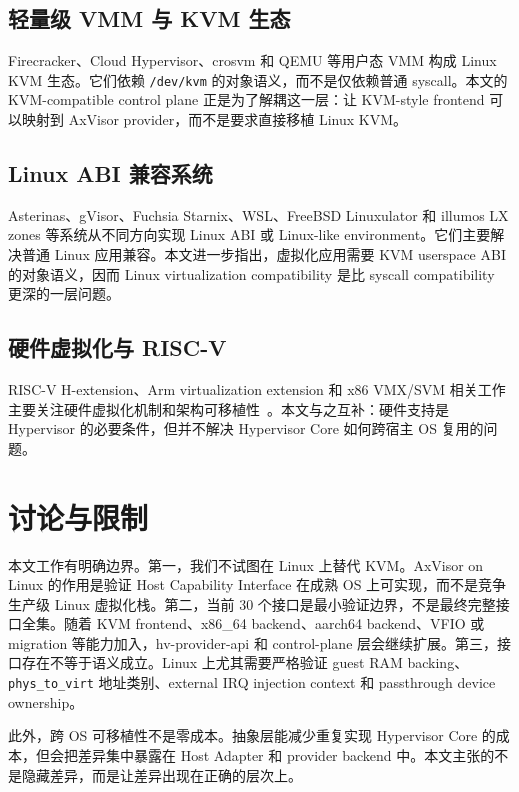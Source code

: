 \documentclass[a4paper,11pt]{article}
\begin{document}
\subsection{轻量级 VMM 与 KVM 生态}

Firecracker、Cloud Hypervisor、crosvm 和 QEMU 等用户态 VMM 构成 Linux KVM 生态。它们依赖 \texttt{/dev/kvm} 的对象语义，而不是仅依赖普通 syscall。本文的 KVM-compatible control plane 正是为了解耦这一层：让 KVM-style frontend 可以映射到 AxVisor provider，而不是要求直接移植 Linux KVM。

\subsection{Linux ABI 兼容系统}

Asterinas、gVisor、Fuchsia Starnix、WSL、FreeBSD Linuxulator 和 illumos LX zones 等系统从不同方向实现 Linux ABI 或 Linux-like environment。它们主要解决普通 Linux 应用兼容。本文进一步指出，虚拟化应用需要 KVM userspace ABI 的对象语义，因而 Linux virtualization compatibility 是比 syscall compatibility 更深的一层问题。

\subsection{硬件虚拟化与 RISC-V}

RISC-V H-extension、Arm virtualization extension 和 x86 VMX/SVM 相关工作主要关注硬件虚拟化机制和架构可移植性~\cite{s2021first,sousa2024hspv}。本文与之互补：硬件支持是 Hypervisor 的必要条件，但并不解决 Hypervisor Core 如何跨宿主 OS 复用的问题。

\section{讨论与限制}

本文工作有明确边界。第一，我们不试图在 Linux 上替代 KVM。AxVisor on Linux 的作用是验证 Host Capability Interface 在成熟 OS 上可实现，而不是竞争生产级 Linux 虚拟化栈。第二，当前 30 个接口是最小验证边界，不是最终完整接口全集。随着 KVM frontend、x86\_64 backend、aarch64 backend、VFIO 或 migration 等能力加入，hv-provider-api 和 control-plane 层会继续扩展。第三，接口存在不等于语义成立。Linux 上尤其需要严格验证 guest RAM backing、\texttt{phys\_to\_virt} 地址类别、external IRQ injection context 和 passthrough device ownership。

此外，跨 OS 可移植性不是零成本。抽象层能减少重复实现 Hypervisor Core 的成本，但会把差异集中暴露在 Host Adapter 和 provider backend 中。本文主张的不是隐藏差异，而是让差异出现在正确的层次上。
\end{document}
